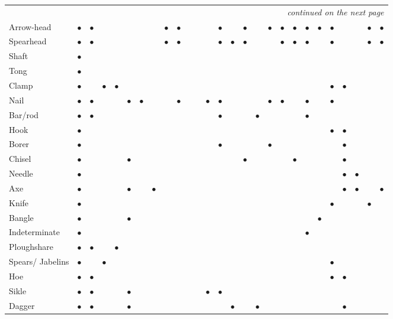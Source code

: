 {{{\begin{longtable}{|l|c|c|c|c|c|c|c|c|c|c|c|c|c|c|c|c|c|c|c|c|c|c|c|c|c|c|}
\hline
\endhead
\hline
\multicolumn{27}{r}{\small\itshape continued on the next page}\\
\endfoot
\endlastfoot
\hline
Arrow-head & $\bullet$ & $\bullet$ & &&&&& $\bullet$ &$\bullet$ &&&& $\bullet$ & & $\bullet$ & & $\bullet$ &$\bullet$ &$\bullet$ &$\bullet$ &$\bullet$ &$\bullet$ &&& $\bullet$ &$\bullet$ \\
Spearhead & $\bullet$ & $\bullet$ &&&&&& $\bullet$ &$\bullet$ &&&& $\bullet$ & $\bullet$ &$\bullet$ & && $\bullet$ &$\bullet$ & $\bullet$  & & $\bullet$ && & $\bullet$& $\bullet$\\
Shaft & $\bullet$&  &&&&&&&&&&&&&&&&&&&&&&&&\\
Tong & $\bullet$ &  &&&&&&&&&&&&&&&&&&&&&&&&\\
Clamp & $\bullet$  & & $\bullet$  & $\bullet$ &&&&&&&&&&&&&&&&& & $\bullet$ & $\bullet$  & & & \\ 
Nail & $\bullet$ & $\bullet$&&&$\bullet$&$\bullet$&&&$\bullet$&&&$\bullet$&$\bullet$&&&&$\bullet$&$\bullet$&&$\bullet$&&$\bullet$&&&&\\
Bar/rod & $\bullet$ & $\bullet$ &&&&&&&&&& & $\bullet$ && &$\bullet$ & &&& $\bullet$ & & &&& & \\
Hook & $\bullet$ & &&&&&&&&&&&&&&&&&& &&$\bullet$ & $\bullet$ & &&\\
Borer & $\bullet$&&&&&&&&&&&&$\bullet$&&&&$\bullet$&&&&&&$\bullet$&&&\\
Chisel &$\bullet$&&&&$\bullet$&&&&&&&&&&$\bullet$&&&&$\bullet$&&&&$\bullet$&&& \\
Needle &$\bullet$&&&&&&&&&&&&&&&&&&&&&&$\bullet$&$\bullet$&& \\
Axe &$\bullet$&&&&$\bullet$&&$\bullet$&&&&&&&&&&&&&&&&$\bullet$&$\bullet$&&$\bullet$ \\
 Knife &$\bullet$&&&&&&&&&&&&&&&&&&&&&$\bullet$&&&$\bullet$& \\
Bangle &$\bullet$&&&&$\bullet$&&&&&&&&&&&&&&&&$\bullet$&&&&& \\
{Indeterminate} &$\bullet$&&&&&&&&&&&&&&&&&&&$\bullet$&&&&&& \\
{Ploughshare} &$\bullet$&$\bullet$&&$\bullet$&&&&&&&&&&&&&&&&&&&&&& \\
{Spears/ Jabelins} &$\bullet$&&$\bullet$&&&&&&&&&&&&&&&&&&&$\bullet$&&&& \\
Hoe &$\bullet$&$\bullet$&&&&&&&&&&&&&&&&&&&&$\bullet$&$\bullet$&&& \\
Sikle &$\bullet$&$\bullet$&&&$\bullet$&&&&&&&$\bullet$&$\bullet$&&&&&&&&&&&&& \\
 Dagger &$\bullet$&$\bullet$&&&$\bullet$&&&&&&&&&$\bullet$&&$\bullet$&&&&&&&$\bullet$&&& \\

\end{longtable}}}}
